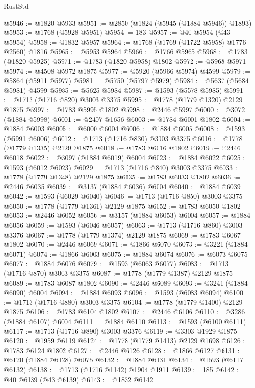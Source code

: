 \begin{lexlean}{RustStd}
\begin{coremodule}
@5946 := @1820 @5933
@5951 := @2850 (@1824 (@5945 (@1884 @5946)) @1893)
@5953 := @1768 (@5928 @5951)
@5954 := 183
@5957 := @40 @5954 (@43 @5954)
@5958 := @1832 @5957
@5964 := @1768 (@1769 (@1722 @5958) @1776 @2560) @1816
@5965 := @5953 @5964
@5966 := @1766 @5965
@5968 := @1783 (@1820 @5925)
@5971 := @1783 (@1820 @5958) @1802
@5972 := @5968 @5971
@5974 := @4508 @5972 @1875
@5977 := @5920 (@5966 @5974) @4599
@5979 := @5864 (@5911 @5977)
@5981 := @5750 (@5797 @5979)
@5984 := @5637 (@5684 @5981) @4599
@5985 := @5625 @5984
@5987 := @1593 (@5578 @5985)
@5991 := @1713 (@1716 @820) @3003 @3375
@5995 := @1778 (@1779 @1320) @2129 @1875
@5997 := @1783 @5995 @1802
@5998 := @2446 @5997
@6000 := @3072 (@1884 @5998)
@6001 := @2407 @1656
@6003 := @1784 @6001 @1802
@6004 := @1884 @6003
@6005 := @6000 @6004
@6006 := @1884 @6005
@6008 := @1593 (@5991 @6006)
@6012 := @1713 (@1716 @830) @3003 @3375
@6016 := @1778 (@1779 @1335) @2129 @1875
@6018 := @1783 @6016 @1802
@6019 := @2446 @6018
@6022 := @3097 (@1884 @6019) @6004
@6023 := @1884 @6022
@6025 := @1593 (@6012 @6023)
@6029 := @1713 (@1716 @840) @3003 @3375
@6033 := @1778 (@1779 @1348) @2129 @1875
@6035 := @1783 @6033 @1802
@6036 := @2446 @6035
@6039 := @3137 (@1884 @6036) @6004
@6040 := @1884 @6039
@6042 := @1593 (@6029 @6040)
@6046 := @1713 (@1716 @850) @3003 @3375
@6050 := @1778 (@1779 @1361) @2129 @1875
@6052 := @1783 @6050 @1802
@6053 := @2446 @6052
@6056 := @3157 (@1884 @6053) @6004
@6057 := @1884 @6056
@6059 := @1593 (@6046 @6057)
@6063 := @1713 (@1716 @860) @3003 @3376
@6067 := @1778 (@1779 @1374) @2129 @1875
@6069 := @1783 @6067 @1802
@6070 := @2446 @6069
@6071 := @1866 @6070
@6073 := @3221 (@1884 @6071)
@6074 := @1866 @6003
@6075 := @1884 @6074
@6076 := @6073 @6075
@6077 := @1884 @6076
@6079 := @1593 (@6063 @6077)
@6083 := @1713 (@1716 @870) @3003 @3375
@6087 := @1778 (@1779 @1387) @2129 @1875
@6089 := @1783 @6087 @1802
@6090 := @2446 @6089
@6093 := @3241 (@1884 @6090) @6004
@6094 := @1884 @6093
@6096 := @1593 (@6083 @6094)
@6100 := @1713 (@1716 @880) @3003 @3375
@6104 := @1778 (@1779 @1400) @2129 @1875
@6106 := @1783 @6104 @1802
@6107 := @2446 @6106
@6110 := @3286 (@1884 @6107) @6004
@6111 := @1884 @6110
@6113 := @1593 (@6100 @6111)
@6117 := @1713 (@1716 @890) @3003 @3376
@6119 := @3303 @1929 @1875
@6120 := @1959 @6119
@6124 := @1778 (@1779 @1413) @2129 @1698
@6126 := @1783 @6124 @1802
@6127 := @2446 @6126
@6128 := @1866 @6127
@6131 := @6120 (@1884 @6128) @6075
@6132 := @1884 @6131
@6134 := @1593 (@6117 @6132)
@6138 := @1713 (@1716 @1142) @1904 @1911
@6139 := 185
@6142 := @40 @6139 (@43 @6139)
@6143 := @1832 @6142

\end{coremodule}
\end{lexlean}
